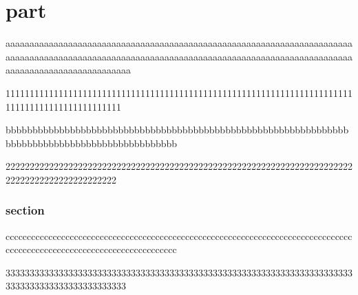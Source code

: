 \documentclass{jarticle}
\begin{document}
\part{part}
aaaaaaaaaaaaaaaaaaaaaaaaaaaaaaaaaaaaaaaaaaaaaaaaaaaaaaaaaaaaaaaaaaaaaaaaaaaaaaaaaaaaaaaaaaaaaaaaaaaaaaaaaaaaaaaaaaaaaaaaaaaaaaaaaaaaaaaaaaaaaaaaaaaaaaaaaaaaaaaaaaaaaaaaaa

111111111111111111111111111111111111111111111111111111111111111111111111111111111111111111111111


bbbbbbbbbbbbbbbbbbbbbbbbbbbbbbbbbbbbbbbbbbbbbbbbbbbbbbbbbbbbbbbbbbbbbbbbbbbbbbbbbbbbbbbbbbbbbbbb

22222222222222222222222222222222222222222222222222222222222222222222222222222222222222222222222

\section{section}

ccccccccccccccccccccccccccccccccccccccccccccccccccccccccccccccccccccccccccccccccccccccccccccccccccccccccccccccccccccccccc

3333333333333333333333333333333333333333333333333333333333333333333333333333333333333333333333333
\end{document}
